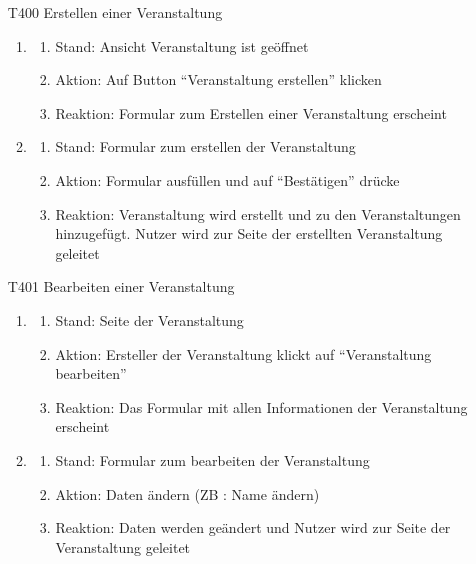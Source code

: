 \documentclass[parskip=full]{scrartcl}
\begin{document}
	\begin{itemize}
		\item[T400] Erstellen einer Veranstaltung
		\begin{enumerate}
			\item
			
			\begin{enumerate}[nosep]
				\item Stand: Ansicht Veranstaltung ist geöffnet
				\item Aktion: Auf \gls{Button} “Veranstaltung erstellen” klicken
				\item Reaktion: Formular zum Erstellen einer Veranstaltung erscheint
			\end{enumerate}
			\item
			\begin{enumerate}[nosep]	
				\item Stand: Formular zum erstellen der Veranstaltung
				\item Aktion: Formular ausfüllen und auf “Bestätigen” drücke
				\item Reaktion: Veranstaltung wird erstellt und zu den Veranstaltungen hinzugefügt. Nutzer wird zur Seite der erstellten Veranstaltung geleitet
			\end{enumerate}	
		\end{enumerate}
		
		\item[T401] Bearbeiten einer Veranstaltung
		\begin{enumerate}
			\item
			
			\begin{enumerate}[nosep]
				\item Stand: Seite der Veranstaltung
				\item Aktion: Ersteller der Veranstaltung klickt auf  “Veranstaltung bearbeiten”
				\item Reaktion: Das Formular mit allen Informationen der Veranstaltung erscheint
			\end{enumerate}
			\item
			\begin{enumerate}[nosep]	
				\item Stand: Formular zum bearbeiten der Veranstaltung
				\item Aktion: Daten ändern (ZB : Name ändern)
				\item Reaktion: Daten werden geändert und Nutzer wird zur Seite der Veranstaltung geleitet
			\end{enumerate}	
		\end{enumerate}
		

\end{itemize}
\end{document}
